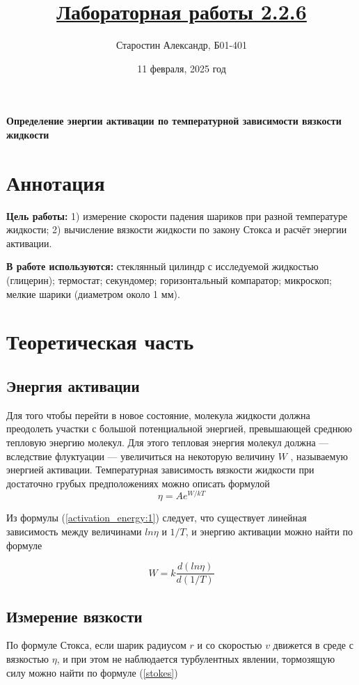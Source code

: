 \documentclass[a4paper]{article}
\title{\underline{Лабораторная работы 2.2.6}}
\author{Старостин Александр, Б01-401}
\date {11 февраля, 2025 год}
\begin{document}
\maketitle
\newpage

\textbf{Определение энергии активации по температурной зависимости вязкости жидкости}

\section{Аннотация}
    \par \textbf{Цель работы:} 1) измерение скорости падения шариков при разной температуре жидкости; 2) вычисление вязкости жидкости по закону Стокса и расчёт энергии активации.\\

    \par \textbf{В работе используются:} стеклянный цилиндр с исследуемой жидкостью (глицерин); термостат; секундомер; горизонтальный компаратор; микроскоп; мелкие шарики (диаметром около 1 мм).


\section{Теоретическая часть}
    \subsection{Энергия активации}
    Для того чтобы перейти в новое состояние, молекула жидкости должна преодолеть участки с большой потенциальной энергией, превышающей среднюю тепловую энергию молекул. Для этого тепловая энергия молекул должна — вследствие флуктуации — увеличиться на некоторую величину $W$ , называемую энергией активации. Температурная зависимость вязкости жидкости при достаточно грубых предположениях можно описать формулой
    \begin{equation} \label{activation_energy:1}
        \eta = A e^{W/kT}
    \end{equation}

    Из формулы (\ref{activation_energy:1}) следует, что существует линейная зависимость между величинами $ln\eta$ и $1/T$, и энергию активации можно найти по формуле

    \begin{equation} \label{activation_energy:2}
        W = k \frac{d(ln\eta)}{d(1/T)}
    \end{equation}

    \subsection{Измерение вязкости}
    По формуле Стокса, если шарик радиусом $r$ и со скоростью $v$ движется в среде с вязкостью $\eta$, и при этом не наблюдается турбулентных явлении, тормозящую силу можно найти по формуле (\ref{stokes})
\end{document}
